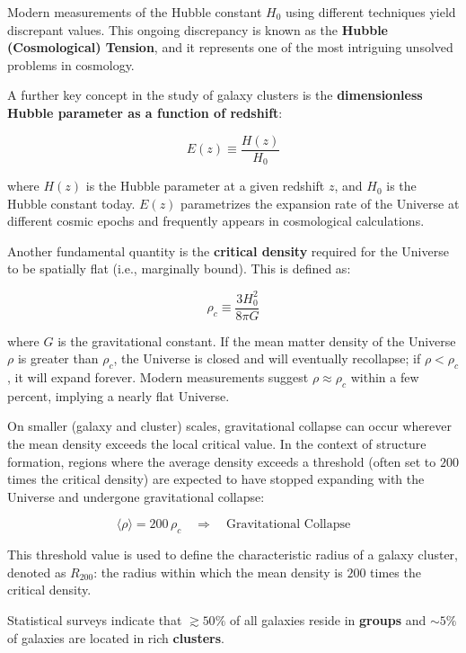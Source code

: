 \begin{observationblock}
    Modern measurements of the Hubble constant $H_0$ using different techniques yield discrepant values. This ongoing discrepancy is known as the \textbf{Hubble (Cosmological) Tension}, and it represents one of the most intriguing unsolved problems in cosmology.
\end{observationblock}

A further key concept in the study of galaxy clusters is the \textbf{dimensionless Hubble parameter as a function of redshift}:

$$
E(z) \equiv \frac{H(z)}{H_0}
$$

where $H(z)$ is the Hubble parameter at a given redshift $z$, and $H_0$ is the Hubble constant today. $E(z)$ parametrizes the expansion rate of the Universe at different cosmic epochs and frequently appears in cosmological calculations.

\medskip

Another fundamental quantity is the \textbf{critical density} required for the Universe to be spatially flat (i.e., marginally bound). This is defined as:

$$
\rho_c \equiv \frac{3 H_0^2}{8 \pi G}
$$

where $G$ is the gravitational constant. If the mean matter density of the Universe $\rho$ is greater than $\rho_c$, the Universe is closed and will eventually recollapse; if $\rho < \rho_c$, it will expand forever. Modern measurements suggest $\rho \approx \rho_c$ within a few percent, implying a nearly flat Universe.

On smaller (galaxy and cluster) scales, gravitational collapse can occur wherever the mean density exceeds the local critical value. In the context of structure formation, regions where the average density exceeds a threshold (often set to $200$ times the critical density) are expected to have stopped expanding with the Universe and undergone gravitational collapse:

$$
\langle \rho \rangle = 200\, \rho_c \quad \Rightarrow \quad \text{Gravitational Collapse}
$$

This threshold value is used to define the characteristic radius of a galaxy cluster, denoted as $R_{200}$: the radius within which the mean density is $200$ times the critical density.

Statistical surveys indicate that $\gtrsim 50\%$ of all galaxies reside in \textbf{groups} and $\sim 5\%$ of galaxies are located in rich \textbf{clusters}.

